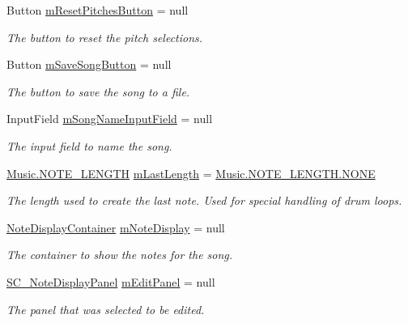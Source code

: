 \begin{DoxyCompactItemize}
Button \hyperlink{group___s_c_priv_var_ga89e82b9c8af6b34d7e0ec37c81f2f674}{m\+Reset\+Pitches\+Button} = null
\begin{DoxyCompactList}\small\item\em The button to reset the pitch selections. \end{DoxyCompactList}\item 
Button \hyperlink{group___s_c_priv_var_ga8bcdbe4c52da2e90edf9afffb35b48d3}{m\+Save\+Song\+Button} = null
\begin{DoxyCompactList}\small\item\em The button to save the song to a file. \end{DoxyCompactList}\item 
Input\+Field \hyperlink{group___s_c_priv_var_ga768474e1f768bfcce7010995020b09f3}{m\+Song\+Name\+Input\+Field} = null
\begin{DoxyCompactList}\small\item\em The input field to name the song. \end{DoxyCompactList}\item 
\hyperlink{group___music_enums_gaf11b5f079adbb21c800b9eca1c5c3cbd}{Music.\+N\+O\+T\+E\+\_\+\+L\+E\+N\+G\+TH} \hyperlink{group___s_c_priv_var_ga220707a4bf66dc6fee4e7bc9b7f2ed60}{m\+Last\+Length} = \hyperlink{group___music_enums_ggaf11b5f079adbb21c800b9eca1c5c3cbdab50339a10e1de285ac99d4c3990b8693}{Music.\+N\+O\+T\+E\+\_\+\+L\+E\+N\+G\+T\+H.\+N\+O\+NE}
\begin{DoxyCompactList}\small\item\em The length used to create the last note. Used for special handling of drum loops. \end{DoxyCompactList}\item 
\hyperlink{class_note_display_container}{Note\+Display\+Container} \hyperlink{group___s_c_priv_var_ga19cefeb7077126193c7f60d07dfdf32c}{m\+Note\+Display} = null
\begin{DoxyCompactList}\small\item\em The container to show the notes for the song. \end{DoxyCompactList}\item 
\hyperlink{class_s_c___note_display_panel}{S\+C\+\_\+\+Note\+Display\+Panel} \hyperlink{group___s_c_priv_var_ga0f5cfc2d0492190ded3fbda5b43b45e4}{m\+Edit\+Panel} = null
\begin{DoxyCompactList}\small\item\em The panel that was selected to be edited. \end{DoxyCompactList}\item 

\end{DoxyCompactItemize}
